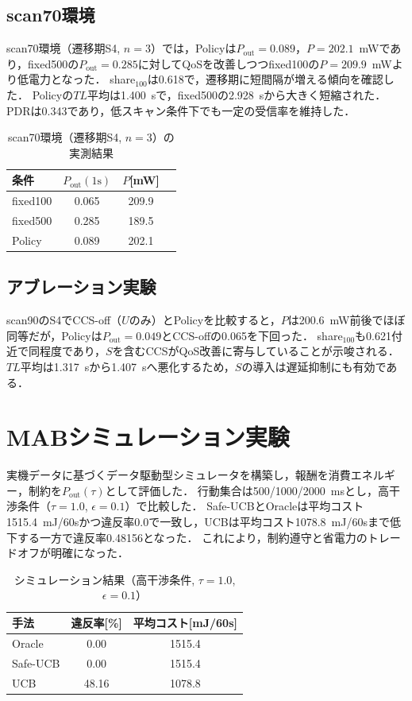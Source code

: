 \documentclass[a4paper,10pt,twocolumn]{ltjsarticle}
\newcommand{\Pout}{P_{\mathrm{out}}}
\begin{document}
\subsection{scan70環境}
scan70環境（遷移期S4, $n=3$）では，Policyは$\Pout=0.089$，$P=202.1$~mWであり，fixed500の$\Pout=0.285$に対してQoSを改善しつつfixed100の$P=209.9$~mWより低電力となった．
share$_{100}$は0.618で，遷移期に短間隔が増える傾向を確認した．
Policyの$TL$平均は1.400~sで，fixed500の2.928~sから大きく短縮された．
PDRは0.343であり，低スキャン条件下でも一定の受信率を維持した．

\begin{table}[t]
\centering
\footnotesize
\caption{scan70環境（遷移期S4, $n=3$）の実測結果}
\label{tab:scan70}
\begin{tabular}{lccc}
\toprule
条件 & $\Pout(1\mathrm{s})$ & $P$[mW] \\
\midrule
fixed100 & 0.065 & 209.9 \\
fixed500 & 0.285 & 189.5 \\
Policy & 0.089 & 202.1 \\
\bottomrule
\end{tabular}
\end{table}

\subsection{アブレーション実験}
scan90のS4でCCS-off（$U$のみ）とPolicyを比較すると，$P$は200.6~mW前後でほぼ同等だが，Policyは$\Pout=0.049$とCCS-offの0.065を下回った．
share$_{100}$も0.621付近で同程度であり，$S$を含むCCSがQoS改善に寄与していることが示唆される．
$TL$平均は1.317~sから1.407~sへ悪化するため，$S$の導入は遅延抑制にも有効である．

\section{MABシミュレーション実験}
実機データに基づくデータ駆動型シミュレータを構築し，報酬を消費エネルギー，制約を$\Pout(\tau)$として評価した．
行動集合は500/1000/2000~msとし，高干渉条件（$\tau=1.0$, $\epsilon=0.1$）で比較した．
Safe-UCBとOracleは平均コスト1515.4~mJ/60sかつ違反率0.0で一致し，UCBは平均コスト1078.8~mJ/60sまで低下する一方で違反率0.48156となった．
これにより，制約遵守と省電力のトレードオフが明確になった．

\begin{table}[t]
\centering
\footnotesize
\caption{シミュレーション結果（高干渉条件, $\tau=1.0$, $\epsilon=0.1$）}
\label{tab:sim}
\begin{tabular}{lcc}
\toprule
手法 & 違反率[\%] & 平均コスト[mJ/60s] \\
\midrule
Oracle & 0.00 & 1515.4 \\
Safe-UCB & 0.00 & 1515.4 \\
UCB & 48.16 & 1078.8 \\
\bottomrule
\end{tabular}
\end{table}
\end{document}
